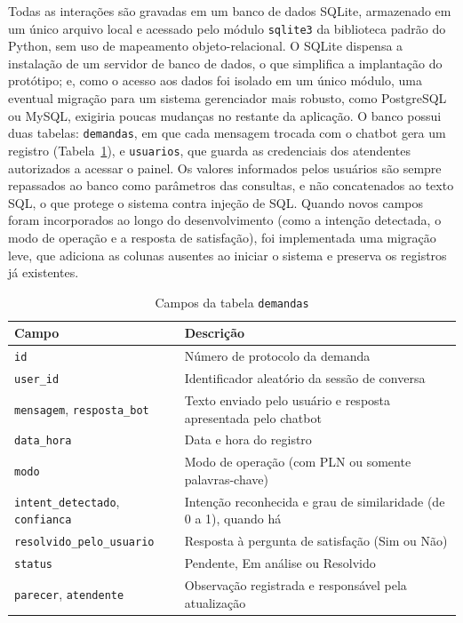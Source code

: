 \documentclass[12pt]{article}
\begin{document}
Todas as interações são gravadas em um banco de dados SQLite, armazenado em um
único arquivo local e acessado pelo módulo \texttt{sqlite3} da biblioteca
padrão do Python, sem uso de mapeamento objeto-relacional. O SQLite dispensa a
instalação de um servidor de banco de dados, o que simplifica a implantação do
protótipo; e, como o acesso aos dados foi isolado em um único módulo, uma
eventual migração para um sistema gerenciador mais robusto, como PostgreSQL ou
MySQL, exigiria poucas mudanças no restante da aplicação. O banco possui duas
tabelas: \texttt{demandas}, em que cada mensagem trocada com o chatbot gera um
registro (Tabela~\ref{tab:demandas}), e \texttt{usuarios}, que guarda as
credenciais dos atendentes autorizados a acessar o painel. Os valores
informados pelos usuários são sempre repassados ao banco como parâmetros das
consultas, e não concatenados ao texto SQL, o que protege o sistema contra
injeção de SQL. Quando novos campos foram incorporados ao longo do
desenvolvimento (como a intenção detectada, o modo de operação e a resposta de
satisfação), foi implementada uma migração leve, que adiciona as colunas
ausentes ao iniciar o sistema e preserva os registros já existentes.

\begin{table}[H]
  \centering
  \begin{tabular}{|p{}|p{}|}
    \hline
    \textbf{Campo} & \textbf{Descrição} \\ \hline
    \texttt{id} & Número de protocolo da demanda \\ \hline
    \texttt{user\_id} & Identificador aleatório da sessão de conversa \\ \hline
    \texttt{mensagem}, \texttt{resposta\_bot} & Texto enviado pelo usuário e
    resposta apresentada pelo chatbot \\ \hline
    \texttt{data\_hora} & Data e hora do registro \\ \hline
    \texttt{modo} & Modo de operação (com PLN ou somente palavras-chave) \\ \hline
    \texttt{intent\_detectado}, \texttt{confianca} & Intenção reconhecida e
    grau de similaridade (de 0 a 1), quando há \\ \hline
    \texttt{resolvido\_pelo\_usuario} & Resposta à pergunta de satisfação (Sim
    ou Não) \\ \hline
    \texttt{status} & Pendente, Em análise ou Resolvido \\ \hline
    \texttt{parecer}, \texttt{atendente} & Observação registrada e responsável
    pela atualização \\ \hline
  \end{tabular}
  \caption{Campos da tabela \texttt{demandas}}
  \label{tab:demandas}
\end{table}
\end{document}
